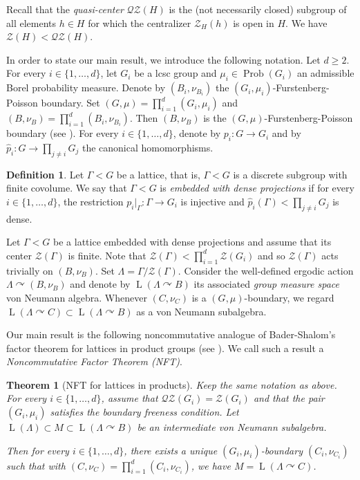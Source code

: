 \documentclass[11pt]{article}
\newtheorem{letterthm}{Theorem}
\theoremstyle{definition}
\newtheorem*{definition}{Definition}
\DeclareMathOperator{\Prob}{Prob}
\DeclareMathOperator{\rL}{L}
\begin{document}
Recall that the \emph{quasi-center} $\mathscr{Q}\mathscr{Z}(H)$ is the (not necessarily closed) subgroup of all elements $h \in H$ for which the centralizer $\mathscr Z_H(h)$ is open in $H$. We have $\mathscr Z(H) < \mathscr{Q}\mathscr{Z}(H)$.

In order to state our main result, we introduce the following notation. Let $d \geq 2$. For every $i \in \{1, \dots, d\}$, let $G_i$ be a lcsc group and $\mu_i \in \Prob(G_i)$ an admissible Borel probability measure. Denote by $(B_i, \nu_{B_i})$ the $(G_i, \mu_i)$-Furstenberg-Poisson boundary. Set $(G, \mu) = \prod_{i = 1}^d (G_i, \mu_i)$ and $(B, \nu_B) = \prod_{i = 1}^d (B_i, \nu_{B_i})$. Then $(B, \nu_B)$ is the $(G, \mu)$-Furstenberg-Poisson boundary (see \cite[Cor.\,3.2]{BS04}). For every $i \in \{1, \dots, d\}$, denote by $p_i : G \to G_i$ and by $\widehat p_i : G \to \prod_{j \neq i} G_j$ the canonical homomorphisms.

\begin{definition}
Let $\Gamma < G$ be a lattice, that is, $\Gamma < G$ is a discrete subgroup with finite covolume. We say that $\Gamma < G$ is \emph{embedded with dense projections} if for every $i \in \{1, \dots, d\}$, the restriction $p_i|_\Gamma : \Gamma \to G_i$ is injective and $\widehat p_i(\Gamma) < \prod_{j \neq i} G_j$ is dense.
\end{definition}

Let $\Gamma < G$ be a lattice embedded with dense projections and assume that its center $\mathscr Z(\Gamma)$ is finite. Note that $\mathscr Z(\Gamma) < \prod_{i = 1}^d \mathscr Z(G_i)$ and so $\mathscr Z(\Gamma)$ acts trivially on $(B, \nu_B)$. Set $\Lambda = \Gamma/\mathscr Z(\Gamma)$. Consider the well-defined ergodic action $\Lambda \curvearrowright (B, \nu_B)$ and denote by $\rL(\Lambda \curvearrowright B)$ its associated \emph{group measure space} von Neumann algebra. Whenever $(C, \nu_C)$ is a $(G, \mu)$-boundary, we regard $\rL(\Lambda \curvearrowright C) \subset \rL(\Lambda \curvearrowright B)$ as a von Neumann subalgebra.

Our main result is the following noncommutative analogue of Bader-Shalom's factor theorem for lattices in product groups (see \cite[Th.\,1.7]{BS04}). We call such a result a \emph{Noncommutative Factor Theorem (NFT)}.

\begin{letterthm}[NFT for lattices in products]\label{thmA}
Keep the same notation as above. For every $i \in \{1, \dots, d\}$, assume that $\mathscr{Q}\mathscr{Z}(G_i) = \mathscr Z(G_i)$ and that the pair $(G_i, \mu_i)$ satisfies the boundary freeness condition. Let $\rL(\Lambda) \subset M \subset \rL(\Lambda \curvearrowright B)$ be an intermediate von Neumann subalgebra.

Then for every $i \in \{1, \dots, d\}$, there exists a unique $(G_i, \mu_i)$-boundary $(C_i, \nu_{C_i})$ such that with $(C, \nu_C) = \prod_{i = 1}^d (C_i, \nu_{C_i})$, we have $M = \rL(\Lambda \curvearrowright C)$.
\end{letterthm}
\end{document}

